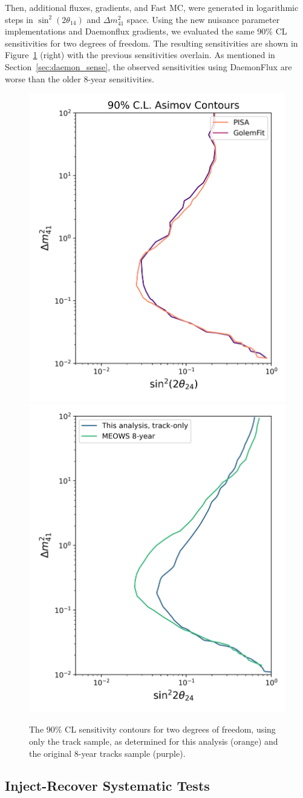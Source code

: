 \documentclass[main.tex]{subfiles}
\begin{document}
Then, additional fluxes, gradients, and Fast MC, were generated in logarithmic steps in $\sin^{2}(2\theta_{14})$ and $\Delta m_{41}^{2}$ space.
Using the new nuisance parameter implementations and Daemonflux gradients, we evaluated the same 90\% CL sensitivities for two degrees of freedom.
The resulting sensitivities are shown in Figure~\ref{fig:comparison} (right) with the previous sensitivities overlain. 
As mentioned in Section~\ref{sec:daemon_sense}, the observed sensitivities using DaemonFlux are worse than the older 8-year sensitivities. 

\begin{figure}
    \centering
    \includegraphics[width=0.45\linewidth]{figures/2d_compare_llh.png}%
    \includegraphics[width=0.45\linewidth]{figures/no_bubbles.png}
    \caption{The 90\% CL sensitivity contours for two degrees of freedom, using only the track sample, as determined for this analysis (orange) and the original 8-year tracks sample (purple).}\label{fig:comparison}
\end{figure}

\subsection{Inject-Recover Systematic Tests}
\end{document}
